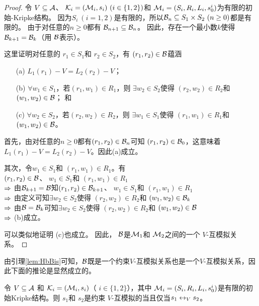 \begin{proof}
	令 $V \subseteq {\cal A}$、 ${\cal K}_i=({\cal M}_i,s_i)~(i\in\{1,2\})$和 ${\cal M}_i=(S_i, R_i,L_i, s_0^i)$为有限的初始-Kripke结构。
	因为$S_i~(i=1,2)$是有限的，所以${\cal B}_n\subseteq S_1\times S_2~(n\ge 0)$都是有限的。
	由于对任意的$n\geq 0$都有 ${\cal B}_{n+1} \subseteq {\cal B}_n$。
	因此，存在一个最小数$k$使得
	${\cal B}_{k+1} ={\cal B}_k$（用 ${\cal B}$表示）。

	
	这里证明对任意的 $r_1\in S_1$和 $r_2 \in S_2$，有 $(r_1, r_2)\in {\cal B}$蕴涵 %
	\begin{itemize}
		\item[(a)] $L_1(r_1)-V = L_2(r_2)-V$；
		\item[(b)] $\forall w_1\in S_1$，若$(r_1, w_1)\in R_1$，则 $\exists w_2 \in S_2$使得 $(r_2,w_2) \in R_2$和 $(w_1, w_2) \in {\cal B}$； 和
		\item[(c)] $\forall w_2\in S_2$，若$(r_2, w_2)\in R_2$，则 $\exists w_1 \in S_1$使得 $(r_1,w_1) \in R_1$和 $(w_1, w_2)\in {\cal B} $。
	\end{itemize}
	
	首先，由对任意的$n\ge 0$都有$(r_1, r_2)\in {\cal B}_n$可知 $(r_1, r_2) \in {\cal B}_0$，这意味着
	$L_1(r_1)-V = L_2(r_2)-V$。因此(a)成立。
	
	其次，令$w_1 \in S_1$和 $(r_1, w_1)\in R_1$。有 \\
	$(r_1,r_2)\in {\cal B}$、 $w_1 \in S_1$和 $(r_1, w_1)\in R_1$\\
	$\Rightarrow$ 由${\cal B}_{k+1}={\cal B}$知$(r_1,r_2)\in {\cal B}_{k+1}$、 $w_1 \in S_1$和 $(r_1, w_1)\in R_1$\\
	$\Rightarrow$ 由定义可知$\exists w_2\in S_2$使得 $(r_2, w_2)\in R_2$和 $(w_1,w_2)\in {\cal B}_k$\\
	$\Rightarrow$ 由${\cal B}={\cal B}_k$可知$\exists w_2\in S_2$使得 $(r_2, w_2)\in R_2$和 $(w_1,w_2)\in {\cal B}$\\
	$\Rightarrow$ (b)成立。
	
	可以类似地证明 (c)也成立。
	因此， ${\cal B}$是${\cal M}_1$和 ${\cal M}_2$之间的一个 $V$-互模拟关系。
\end{proof}

由引理\ref{lem:HbBis}可知，${\cal B}$既是一个约束$V$-互模拟关系也是一个$V$-互模拟关系，因此下面的推论是显然成立的。
\begin{corollary} \label{lem:bounedToGe}
	令 $V \subseteq {\cal A}$ 和 ${\cal K}_i=({\cal M}_i,s_i)$（ $i\in\{1,2\}$），其中 ${\cal M}_i=(S_i, R_i,L_i, s_0^i)$是有限的初始Kripke结构。则
	$s_1$和 $s_2$是约束 $V$-互模拟的当且仅当$s_1 \leftrightarrow_V s_2$。
\end{corollary}

